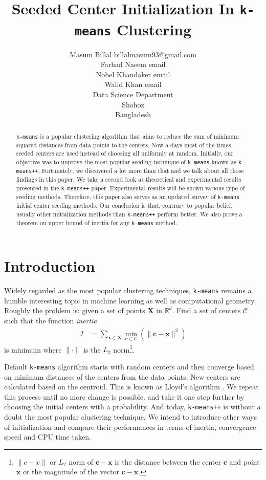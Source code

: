 \documentclass[twoside, 11pt]{article}
\title{Seeded Center Initialization In \texttt{k-means} Clustering}
\author{
	\name Masum Billal 
	\email billalmasum93@gmail.com\\
	\name Farhad Naeem
	\email email\\
	\name Nobel Khandaker
	\email email\\
	\name Walid Khan
	\email email\\
	\addr Data Science Department\\
	Shohoz\\
	Bangladesh
}
\newcommand{\x}{\mathbf{x}}
\newcommand{\X}{\mathbf{X}}
\renewcommand{\c}{\mathbf{c}}
\newcommand{\C}{\mathcal{C}}
\begin{document}
	
	\maketitle
		\begin{abstract}%
			\texttt{k-means} is a popular clustering algorithm that aims to reduce the sum of minimum squared distances from data points to the centers. Now a days most of the times seeded centers are used instead of choosing all uniformly at random. Initially, our objective was to improve the most popular seeding technique of \texttt{k-means} known as \texttt{k-means++}. Fortunately, we discovered a lot more than that and we talk about all those findings in this paper. We take a second look at theoretical and experimental results presented in the \texttt{k-means++} paper. Experimental results will be shown various type of seeding methods. Therefore, this paper also serves as an updated survey of \texttt{k-means} initial center seeding methods. Our conclusion is that, contrary to popular belief, usually  other initialization methods than \texttt{k-means++} perform better. We also prove a theorem on upper bound of inertia for any \texttt{k-means} method.
		\end{abstract}
	\section{Introduction}
	Widely regarded as the most popular clustering techniques, \texttt{k-means} remains a humble interesting topic in machine learning as well as computational geometry. Roughly the problem is: given a set of points $\X$ in $\mathbb{R}^d$. Find a set of centers $\mathcal{C}$ such that the function \textit{inertia}
		\begin{align*}
			\mathcal{I} & = \sum_{\x\in\X}\min_{\c\in\C}(\|\c-\x\|^2)
		\end{align*}
	is minimum where $\|\cdot\|$ is the $L_2$ norm\footnote{$\|c-x\|$ or $L_2$ norm of $\c-\x$ is the distance between the center $\c$ and point $\x$ or the magnitude of the vector $\c-\x$.}.
	
	Default \texttt{k-means} algorithm starts with random centers and then converge based on minimum distances of the centers from the data points. New centers are calculated based on the centroid. This is known as Lloyd's algorithm \citep{lloyd}. We repeat this process until no more change is possible. \cite{ostrovsky} and \cite{kmeans++} take it one step further by choosing the initial centers with a probability. And today, \texttt{k-means++} is without a doubt the most popular clustering technique. We intend to introduce other ways of initialization and compare their performances in terms of inertia, convergence speed and CPU time taken.
	
\end{document}
